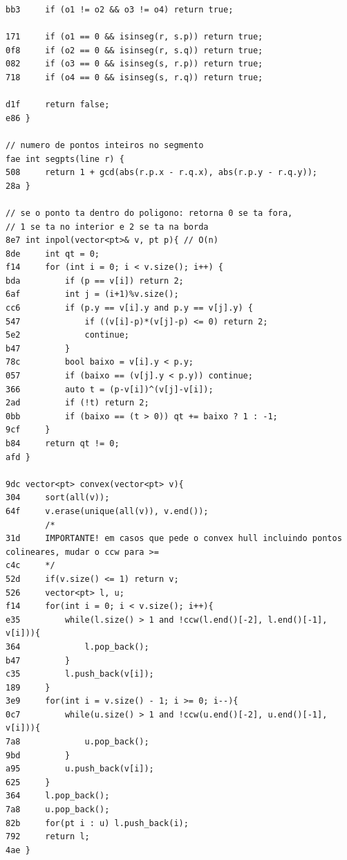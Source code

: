 \documentclass[11pt, a4paper, twoside]{article}
\begin{document}
\begin{lstlisting}
bb3     if (o1 != o2 && o3 != o4) return true;
    
171     if (o1 == 0 && isinseg(r, s.p)) return true;
0f8     if (o2 == 0 && isinseg(r, s.q)) return true;
082     if (o3 == 0 && isinseg(s, r.p)) return true;
718     if (o4 == 0 && isinseg(s, r.q)) return true;
    
d1f     return false;
e86 }

// numero de pontos inteiros no segmento
fae int segpts(line r) {
508 	return 1 + gcd(abs(r.p.x - r.q.x), abs(r.p.y - r.q.y));
28a }

// se o ponto ta dentro do poligono: retorna 0 se ta fora,
// 1 se ta no interior e 2 se ta na borda
8e7 int inpol(vector<pt>& v, pt p){ // O(n)
8de 	int qt = 0;
f14 	for (int i = 0; i < v.size(); i++) {
bda 		if (p == v[i]) return 2;
6af 		int j = (i+1)%v.size();
cc6 		if (p.y == v[i].y and p.y == v[j].y) {
547 			if ((v[i]-p)*(v[j]-p) <= 0) return 2;
5e2 			continue;
b47 		}
78c 		bool baixo = v[i].y < p.y;
057 		if (baixo == (v[j].y < p.y)) continue;
366 		auto t = (p-v[i])^(v[j]-v[i]);
2ad 		if (!t) return 2;
0bb 		if (baixo == (t > 0)) qt += baixo ? 1 : -1;
9cf 	}
b84 	return qt != 0;
afd }

9dc vector<pt> convex(vector<pt> v){
304     sort(all(v));
64f     v.erase(unique(all(v)), v.end());
        /*
31d     IMPORTANTE! em casos que pede o convex hull incluindo pontos colineares, mudar o ccw para >=
c4c     */
52d     if(v.size() <= 1) return v;
526     vector<pt> l, u;
f14     for(int i = 0; i < v.size(); i++){
e35         while(l.size() > 1 and !ccw(l.end()[-2], l.end()[-1], v[i])){
364             l.pop_back();
b47         }
c35         l.push_back(v[i]);
189     }
3e9     for(int i = v.size() - 1; i >= 0; i--){
0c7         while(u.size() > 1 and !ccw(u.end()[-2], u.end()[-1], v[i])){
7a8             u.pop_back();
9bd         }
a95         u.push_back(v[i]);
625     }
364     l.pop_back();
7a8     u.pop_back();
82b     for(pt i : u) l.push_back(i);
792     return l;
4ae }
\end{lstlisting}
\end{document}
